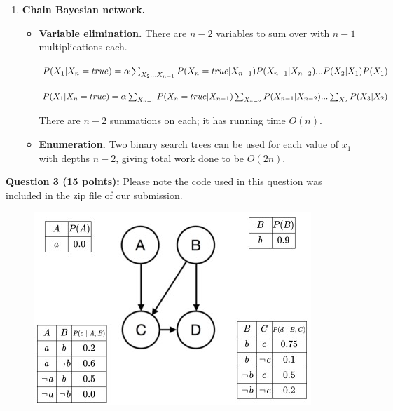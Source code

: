 \documentclass[12pt]{article}
\begin{document}
\begin{enumerate}[label=(\alph*)]
    \item \textbf{Chain Bayesian network.} 
        \begin{itemize}
            \item \textbf{Variable elimination.} There are $n-2$ variables to sum over with $n-1$ multiplications each.
            
            $\\ P(X_1 | X_n = true) = \alpha \sum_{X_2 ... X_{n-1}} P(X_n = true | X_{n-1})P(X_{n-1} | X_{n-2}) ... P(X_2 | X_1)P(X_1)\\$
            
            $ P(X_1 | X_n = true) = \alpha \sum_{X_{n-1}} P(X_n = true | X_{n-1}) \sum_{X_{n-2}} P(X_{n-1} | X_{n-2}) ... \sum_{X_2}P(X_3 | X_2)\\$
            
            There are $n-2$ summations on each; it has running time $O(n)$.
            \item \textbf{Enumeration.} Two binary search trees can be used for each value of $x_1$ with depths $n-2$, giving total work done to be $O(2n)$.
        \end{itemize}
    
\end{enumerate}

\vspace{0.4cm}

\textbf{Question 3 (15 points):} Please note the code used in this question was included in the zip file of our submission.

\begin{figure}[h]
    \centering
    \includegraphics{images/probdescrips/prob3.jpg}
	\caption{}
	\label{fig:prob3}
\end{figure}
\end{document}
